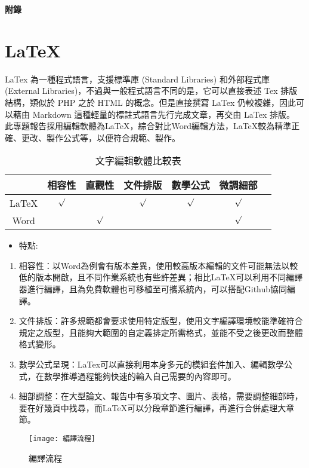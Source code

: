 \begin{appendix}
\renewcommand{\thesection}{\bf 附錄 \Alph{section}}%
\begin{center}
\fontsize{20pt}{0em}\selectfont\bf 附錄
\end{center}
\section*{LaTeX}
LaTex 為一種程式語言，支援標準庫 (Standard Libraries) 和外部程式庫 (External Libraries)，不過與一般程式語言不同的是，它可以直接表述 Tex 排版結構，類似於 PHP 之於 HTML 的概念。但是直接撰寫 LaTex 仍較複雜，因此可以藉由 Markdown 這種輕量的標註式語言先行完成文章，再交由 LaTex 排版。
此專題報告採用編輯軟體為LaTeX，綜合對比Word編輯方法，LaTeX較為精準正確、更改、製作公式等，以便符合規範、製作。
 \begin{table}[htbp] %
			\centering%
			\caption{文字編輯軟體比較表}%
			\large%
			\label{tab_文字編輯軟體比較表:scale}
			\begin{tabular}{|c|c|c|c|c|c|c|}
			\hline
			\diagbox[width=5em]& 相容性 & 直觀性 & 文件排版 & 數學公式 & 微調細部\\ 
			\hline
			LaTeX 		&$\surd$&		&$\surd$&$\surd$&$\surd$\\
			\hline
			Word	 	&		&$\surd$&		&		&$\surd$\\
			\hline
			
			\end{tabular}
		\end{table}	

\begin{itemize} 
\item 特點:
\end{itemize}
\begin{enumerate}
\item 相容性：以Word為例會有版本差異，使用較高版本編輯的文件可能無法以較低的版本開啟，且不同作業系統也有些許差異；相比LaTeX可以利用不同編譯器進行編譯，且為免費軟體也可移植至可攜系統內，可以搭配Github協同編譯。
\item 文件排版：許多規範都會要求使用特定版型，使用文字編譯環境較能準確符合規定之版型，且能夠大範圍的自定義排定所需格式，並能不受之後更改而整體格式變形。
\item 數學公式呈現：LaTex可以直接利用本身多元的模組套件加入、編輯數學公式，在數學推導過程能夠快速的輸入自己需要的內容即可。
\item 細部調整：在大型論文、報告中有多項文字、圖片、表格，需要調整細部時，要在好幾頁中找尋，而LaTeX可以分段章節進行編譯，再進行合併處理大章節。
\end{enumerate}
\begin{figure}[hbt!]
\begin{center}
\texttt{[image: 編譯流程]}
\caption{\Large 編譯流程}
\label{fig.編譯流程}
\end{center}
\end{figure}
\end{appendix}
\newpage